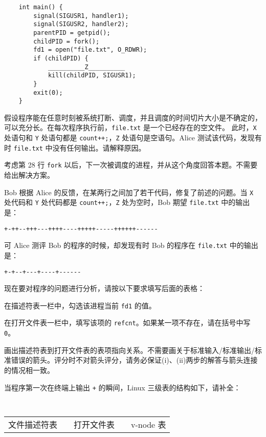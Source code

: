 \begin{problems}
\begin{verbatim}
    int main() {
        signal(SIGUSR1, handler1);
        signal(SIGUSR2, handler2);
        parentPID = getpid();
        childPID = fork();
        fd1 = open("file.txt", O_RDWR);
        if (childPID) {
            __________Z__________
            kill(childPID, SIGUSR1);
        }
        exit(0);
    }
        \end{verbatim}
        假设程序能在任意时刻被系统打断、调度，并且调度的时间切片大小是不确定的，可以充分长。在每次程序执行前，\verb|file.txt| 是一个已经存在的空文件。
        \qn 此时，\verb|X| 处语句和 \verb|Y| 处语句都是 \verb|count++;|，\verb|Z| 处语句是空语句。Alice 测试该代码，发现有时 \verb|file.txt| 中没有任何输出。请解释原因。
        
        \begin{hint}
            考虑第 28 行 \verb|fork| 以后，下一次被调度的进程，并从这个角度回答本题。不需要给出解决方案。
        \end{hint}
        \qn Bob 根据 Alice 的反馈，在某两行之间加了若干代码，修复了前述的问题。当 \verb|X| 处代码和 \verb|Y| 处代码都是 \verb|count++;|，\verb|Z| 处为空时，Bob 期望 \verb|file.txt| 中的输出是：
        \begin{center}
            \verb|+-++--+++---++++----+++++-----++++++------|
        \end{center}
        可 Alice 测评 Bob 的程序的时候，却发现有时 Bob 的程序在 \verb|file.txt| 中的输出是：
        \begin{center}
            \verb|+-+--+---+----+------|
        \end{center}
        现在要对程序的问题进行分析，请按以下要求填写后面的表格：
        \begin{compactenum}[(i)]
            \item 在描述符表一栏中，勾选该进程当前 \verb|fd1| 的值。
            \item 在打开文件表一栏中，填写该项的 \verb|refcnt|。如果某一项不存在，请在括号中写 \verb|0|。
            \item 画出描述符表到打开文件表的表项指向关系。不需要画关于标准输入/标准输出/标准错误的箭头。评分时不对箭头评分，请务必保证(i)、(ii)两步的解答与箭头连接的情况相一致。
        \end{compactenum}
        \subqn 当程序第一次在终端上输出 \verb|+| 的瞬间，Linux 三级表的结构如下，请补全：
        \begin{table}[H]
            \tt
            \centering
            \begin{tabular}{cccccc}
                \multicolumn{2}{c}{文件描述符表} & {\qquad} & 打开文件表 & {\qquad} & v-node 表 \\ \cline{1-2} \cline{4-4} \cline{6-6} 

\end{tabular}
\end{table}
\end{problems}
